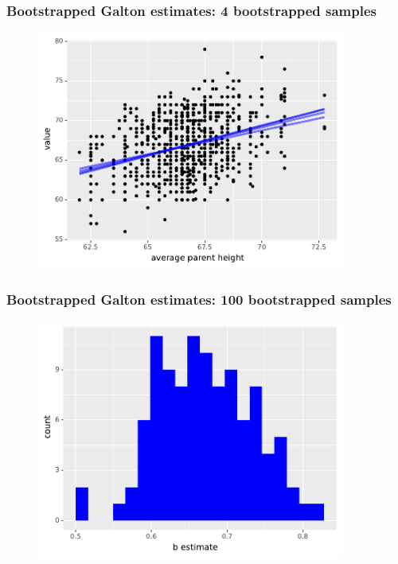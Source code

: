 \documentclass[handout]{beamer}
\begin{document}
\begin{frame}
	\frametitle{Bootstrapped Galton estimates: 4 bootstrapped samples}
	
	\begin{figure}[ht]
		\centerline{\includegraphics[width=0.9\textwidth]{../figures/galton_bootstrapped_estimates.pdf}}
	\end{figure}
	
\end{frame}

\begin{frame}
	\frametitle{Bootstrapped Galton estimates: 100 bootstrapped samples}
	
	\begin{figure}[ht]
		\centerline{\includegraphics[width=0.9\textwidth]{../figures/galton_bootstrapped_estimates_histogram.pdf}}
	\end{figure}
	
\end{frame}
\end{document}
